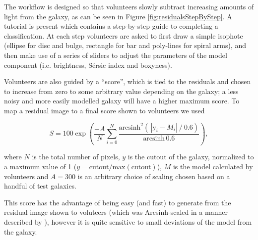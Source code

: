 \documentclass[../main.tex]{subfiles}
\begin{document}
The workflow is designed so that volunteers slowly subtract increasing amounts of light from the galaxy, as can be seen in Figure \ref{fig:residualsStepByStep}. A tutorial is present which contains a step-by-step guide to completing a classification. At each step volunteers are asked to first draw a simple isophote (ellipse for disc and bulge, rectangle for bar and poly-lines for spiral arms), and then make use of a series of sliders to adjust the parameters of the model component (i.e. brightness, S\'ersic index and boxyness).

Volunteers are also guided by a ``score'', which is tied to the residuals and chosen to increase from zero to some arbitrary value depending on the galaxy; a less noisy and more easily modelled galaxy will have a higher maximum score. To map a residual image to a final score shown to volunteers we used

\begin{equation}
  \label{eq:gal_score}
    S = 100 \exp\left(\frac{-A}{N}\sum_{i=0}^N\frac{\text{arcsinh}^2\left(\,|\text{y}_i - M_i|\ /\ 0.6\right)}{\text{arcsinh}\,0.6 }\right),
\end{equation}

where $N$ is the total number of pixels, $y$ is the cutout of the galaxy, normalized to a maximum value of 1 ($y = \text{cutout}/\text{max}(\text{cutout})$), $M$ is the model calculated by volunteers and $A=300$ is an arbitrary choice of scaling chosen based on a handful of test galaxies.

This score has the advantage of being easy (and fast) to generate from the residual image shown to voluteers (which was Arcsinh-scaled in a manner described by \citealt{Lupton2003:astro-ph/0312483v1}), however it is quite sensitive to small deviations of the model from the galaxy.
\end{document}
